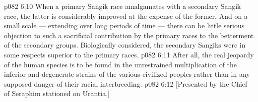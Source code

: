 \vs p082 6:10 \pc When a primary Sangik race amalgamates with a secondary Sangik race, the latter is considerably improved at the expense of the former. And on a small scale --- extending over long periods of time --- there can be little serious objection to such a sacrificial contribution by the primary races to the betterment of the secondary groups. Biologically considered, the secondary Sangiks were in some respects superior to the primary races.
\vs p082 6:11 After all, the real jeopardy of the human species is to be found in the unrestrained multiplication of the inferior and degenerate strains of the various civilized peoples rather than in any supposed danger of their racial interbreeding.
\vsetoff
\vs p082 6:12 [Presented by the Chief of Seraphim stationed on Urantia.]

